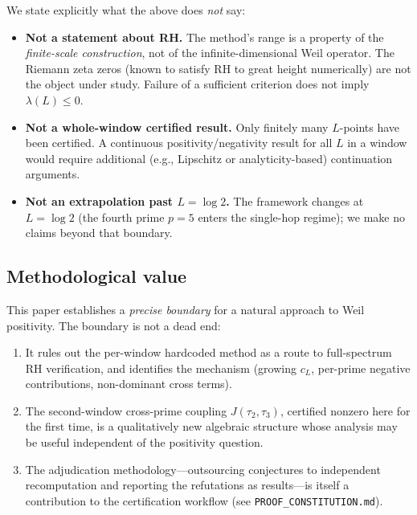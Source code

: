 \documentclass[12pt,a4paper]{amsart}
\theoremstyle{plain}
\theoremstyle{definition}
\newcommand{\cL}{c_L}
\newcommand{\Jcross}{J(\tau_2,\tau_3)}
\begin{document}
We state explicitly what the above does \emph{not} say:
\begin{itemize}[leftmargin=2em]
  \item \textbf{Not a statement about RH.}  The method's range is a property
    of the \emph{finite-scale construction}, not of the infinite-dimensional
    Weil operator.  The Riemann zeta zeros (known to satisfy RH to great
    height numerically) are not the object under study.  Failure of a
    sufficient criterion does not imply $\lambda(L) \le 0$.

  \item \textbf{Not a whole-window certified result.}  Only finitely many
    $L$-points have been certified.  A continuous positivity/negativity
    result for all $L$ in a window would require additional (e.g.,
    Lipschitz or analyticity-based) continuation arguments.

  \item \textbf{Not an extrapolation past $L = \log 2$.}  The framework
    changes at $L = \log 2$ (the fourth prime $p=5$ enters the single-hop
    regime); we make no claims beyond that boundary.
\end{itemize}

\subsection{Methodological value}

This paper establishes a \emph{precise boundary} for a natural approach to
Weil positivity.  The boundary is not a dead end:

\begin{enumerate}[leftmargin=2em,label=(\arabic*)]
  \item It rules out the per-window hardcoded method as a route to
    full-spectrum RH verification, and identifies the mechanism (growing
    $\cL$, per-prime negative contributions, non-dominant cross terms).

  \item The second-window cross-prime coupling $\Jcross$, certified nonzero
    here for the first time, is a qualitatively new algebraic structure whose
    analysis may be useful independent of the positivity question.

  \item The adjudication methodology---outsourcing conjectures to independent
    recomputation and reporting the refutations as results---is itself a
    contribution to the certification workflow (see \texttt{PROOF\_CONSTITUTION.md}).
\end{enumerate}
\end{document}

